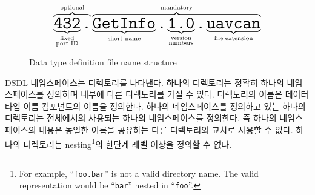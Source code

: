 \begin{figure}[H]
    $$
    \overbrace{%
        \underbrace{\texttt{\huge{432}}}_{\substack{\text{fixed} \\ \text{port-ID}}}%
        \texttt{\huge{.}}%
    }^{\text{optional}}%
    \overbrace{%
        \underbrace{\texttt{\huge{GetInfo}}}_{\substack{\text{short name}}}%
        \texttt{\huge{.}}%
        \underbrace{\texttt{\huge{1.0}}}_{\substack{\text{version} \\ \text{numbers}}}%
        \texttt{\huge{.}}%
        \underbrace{\texttt{\huge{uavcan}}}_{\text{file extension}}%
    }^{\text{mandatory}}
    $$
    \caption{Data type definition file name structure\label{fig:dsdl_definition_file_name_structure}}
\end{figure}

DSDL 네임스페이스는 디렉토리를 나타낸다. 하나의 디렉토리는 정확히 하나의 네임스페이스를 정의하며 내부에 다른 디렉토리를 가질 수 있다.
디렉토리의 이름은 데이터 타입 이름 컴포넌트의 이름을 정의한다.
하나의 네임스페이스를 정의하고 있는 하나의 디렉토리는 전체에서의 사용되는 하나의 네임스페이스를 정의한다. 즉 하나의 네임스페이스의 내용은 동일한 이름을 공유하는 다른 디렉토리와 교차로 사용할 수 없다.
하나의 디렉토리는 
nesting\footnote{%
    For example, ``\texttt{foo.bar}'' is not a valid directory name.
    The valid representation would be ``\texttt{bar}'' nested in ``\texttt{foo}''.
}의 한단계 레벨 이상을 정의할 수 없다.

